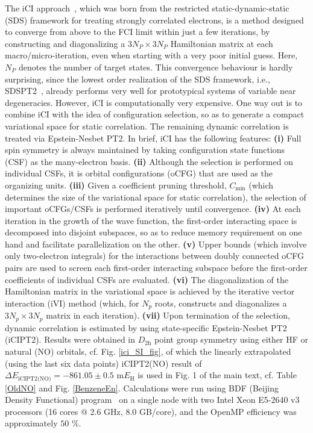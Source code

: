 \documentclass[journal=jcp,manuscript=suppinfo]{achemso}
\begin{document}
The iCI approach~\cite{liu_hoffmann_ici_jctc_2016,liu_hoffmann_ici_jctc_2020}, which was born from the restricted static-dynamic-static~\cite{liu_hoffmann_sds_tca_2014} (SDS) framework for treating strongly correlated electrons, is a method designed to converge from above to the FCI limit within just a few iterations, by constructing and diagonalizing a $3N_P\times3N_P$ Hamiltonian matrix at each macro/micro-iteration, even when starting with a very poor initial guess. Here, $N_P$ denotes the number of target states. This convergence behaviour is hardly surprising, since the lowest order realization of the SDS framework, i.e., SDSPT2~\cite{liu_hoffmann_sdspt2_mp_2017}, already performs very well for prototypical systems of variable near degeneracies. However, iCI is computationally very expensive. One way out is to combine iCI with the idea of configuration selection, so as to generate a compact variational space for static correlation. The remaining dynamic correlation is treated via Epstein-Nesbet PT2. In brief, iCI has the following features: {\bf{(i)}} Full spin symmetry is always maintained by taking configuration state functions (CSF) as the many-electron basis. {\bf{(ii)}} Although the selection is performed on individual CSFs, it is orbital configurations (oCFG) that are used as the organizing units. {\bf{(iii)}} Given a coefficient pruning threshold, $C_{\text{min}}$ (which determines the size of the variational space for static correlation), the selection of important oCFGs/CSFs is performed iteratively until convergence. {\bf{(iv)}} At each iteration in the growth of the wave function, the first-order interacting space is decomposed into disjoint subspaces, so as to reduce memory requirement on one hand and facilitate parallelization on the other. {\bf{(v)}} Upper bounds (which involve only two-electron integrals) for the interactions between doubly connected oCFG pairs are used to screen each first-order interacting subspace before the first-order coefficients of individual CSFs are evaluated. {\bf{(vi)}} The diagonalization of the Hamiltonian matrix in the variational space is achieved by the iterative vector interaction (iVI) method\cite{iVIa,iVIb} (which, for $N_p$ roots, constructs and diagonalizes a $3N_p\times 3N_p$ matrix in each iteration). {\bf{(vii)}} Upon termination of the selection, dynamic correlation is estimated by using state-specific Epstein-Nesbet PT2 (iCIPT2). Results were obtained in $D_{2\text{h}}$ point group symmetry using either HF or natural (NO) orbitals, cf. Fig. \ref{ici_SI_fig}, of which the linearly extrapolated (using the last six data points) iCIPT2(NO) result of $\Delta E_{\text{iCIPT2(NO)}} = -861.05\pm0.5$ m$E_{\text{H}}$ is used in Fig. 1 of the main text, cf. Table \ref{OldNO} and Fig. \ref{BenzeneEn}. Calculations were run using BDF (Beijing Density Functional) program~\cite{bdf_prog_tca_1997,bdf_prog_jcp_2020} on a single node with two Intel Xeon E5-2640 v3 processors (16 cores $@$ 2.6 GHz, 8.0 GB/core), and the OpenMP efficiency was approximately $50$ $\%$.\\
\end{document}
